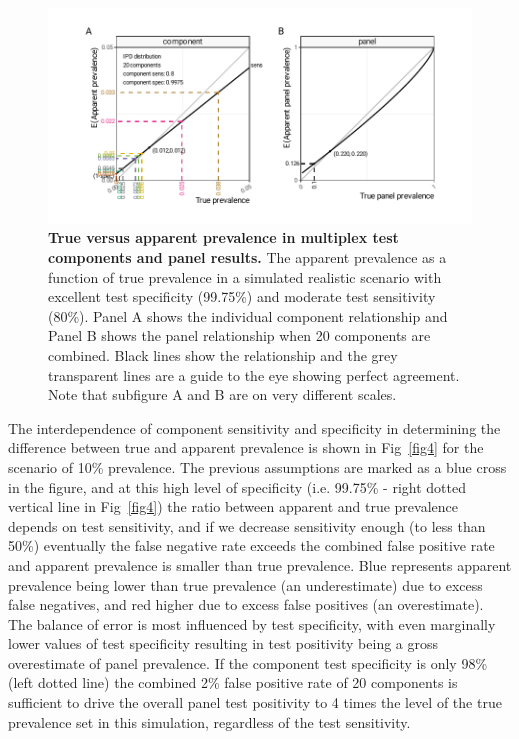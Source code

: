 \documentclass[10pt,letterpaper]{article}
\begin{document}
\begin{figure}[h!]
\centerline{\includegraphics{fig/true-apparent-prevalence-component-panels.pdf}}
\caption{{\bf True versus apparent prevalence in multiplex test components and panel results.}
The apparent prevalence as a function of true prevalence in a simulated realistic scenario with excellent test specificity (99.75\%) and moderate test sensitivity (80\%). Panel A shows the individual component relationship and Panel B shows the panel relationship when 20 components are combined. Black lines show the relationship and the grey transparent lines are a guide to the eye showing perfect agreement. Note that subfigure A and B are on very different scales.
}
\label{fig3}
\end{figure}

The interdependence of component sensitivity and specificity in determining the difference between true and apparent prevalence is shown in Fig~\ref{fig4} for the scenario of 10\% prevalence. The previous assumptions are marked as a blue cross in the figure, and at this high level of specificity (i.e. 99.75\% - right dotted vertical line in Fig~\ref{fig4}) the ratio between apparent and true prevalence depends on test sensitivity, and if we decrease sensitivity enough (to less than 50\%) eventually the false negative rate exceeds the combined false positive rate and apparent prevalence is smaller than true prevalence. Blue represents apparent prevalence being lower than true prevalence (an underestimate) due to excess false negatives, and red higher due to excess false positives (an overestimate). The balance of error is most influenced by test specificity, with even marginally lower values of test specificity resulting in test positivity being a gross overestimate of panel prevalence. If the component test specificity is only 98\% (left dotted line) the combined 2\% false positive rate of 20 components is sufficient to drive the overall panel test positivity to 4 times the level of the true prevalence set in this simulation, regardless of the test sensitivity.
\end{document}
